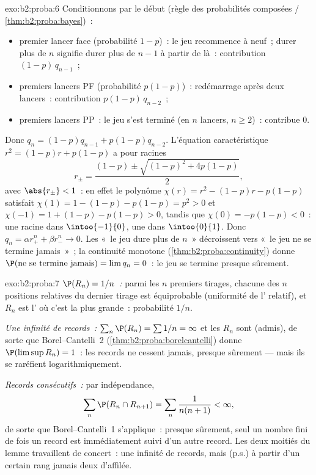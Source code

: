\begin{solution}{exo:b2:proba:6}
Conditionnons par le début (règle des probabilités composées /
\cref{thm:b2:proba:bayes})~:
\begin{itemize}
\item premier lancer face (probabilité $1 - p$)~: le jeu recommence
à neuf~; durer plus de $n$ signifie durer plus de $n - 1$ à partir de
là~: contribution $(1-p)\,q_{n-1}$~;
\item premiers lancers PF (probabilité $p(1-p)$)~: redémarrage après deux
lancers~: contribution $p(1-p)\,q_{n-2}$~;
\item premiers lancers PP~: le jeu s'est terminé (en $n$ lancers, $n
\geq 2$)~: contribue $0$.
\end{itemize}
Donc $q_n = (1-p)q_{n-1} + p(1-p)q_{n-2}$. L'équation
caractéristique $r^2 = (1-p)r + p(1-p)$ a pour racines
\[
r_\pm = \frac{(1-p) \pm \sqrt{(1-p)^2 + 4p(1-p)}}{2},
\]
avec $\abs{r_\pm} < 1$~: en effet le polynôme $\chi(r) = r^2 -
(1-p)r - p(1-p)$ satisfait $\chi(1) = 1 - (1-p) - p(1-p) = p^2 >
0$ et $\chi(-1) = 1 + (1-p) - p(1-p) > 0$, tandis que $\chi(0) =
-p(1-p) < 0$~: une racine dans $\intoo{-1}{0}$, une dans $\intoo{0}{1}$.
Donc $q_n = \alpha r_+^n + \beta r_-^n \to 0$. Les  «~le jeu
dure plus de $n$~» décroissent vers «~le jeu ne se termine jamais~»~; la continuité
monotone (\cref{thm:b2:proba:continuity}) donne
$\P(\text{ne se termine jamais}) = \lim q_n = 0$~: le jeu se termine presque
sûrement.
\end{solution}

\begin{solution}{exo:b2:proba:7}
\emph{$\P(R_n) = 1/n$~:} parmi les $n$ premiers tirages, chacune des $n$
positions relatives du dernier tirage est équiprobable (uniformité
de l' relatif), et $R_n$ est l' où c'est la
plus grande~: probabilité $1/n$.

\emph{Une infinité de records~:} $\sum_n \P(R_n) = \sum 1/n =
\infty$ et les $R_n$ sont  (admis), de sorte que
Borel--Cantelli~2 (\cref{thm:b2:proba:borelcantelli}) donne
$\P(\limsup R_n) = 1$~: les records ne cessent jamais, presque sûrement --- mais
ils se raréfient logarithmiquement.

\emph{Records consécutifs~:} par indépendance,
\[
\sum_n \P(R_n \cap R_{n+1})
= \sum_n \frac{1}{n(n+1)} < \infty ,
\]
de sorte que Borel--Cantelli~1 s'applique~: presque sûrement, seul un nombre fini de
fois un record est immédiatement suivi d'un autre record. Les deux
moitiés du lemme travaillent de concert~: une infinité de records, mais
(p.s.) à partir d'un certain rang jamais deux d'affilée.
\end{solution}

